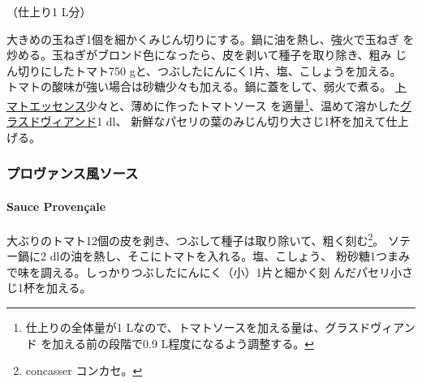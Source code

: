 \begin{recette}

（仕上り1 L分）

大きめの玉ねぎ1個を細かくみじん切りにする。鍋に油を熱し、強火で玉ねぎ
を炒める。玉ねぎがブロンド色になったら、皮を剥いて種子を取り除き、粗み
じん切りにしたトマト750 gと、つぶしたにんにく1片、塩、こしょうを加える。
トマトの酸味が強い場合は砂糖少々も加える。鍋に蓋をして、弱火で煮る。
\protect\hyperlink{essences-diverses}{トマトエッセンス}少々と、薄めに作ったトマトソース
を適量\footnote{仕上りの全体量が1
  Lなので、トマトソースを加える量は、グラスドヴィアンド
  を加える前の段階で0.9 L程度になるよう調整する。}、温めて溶かした\protect\hyperlink{glace-de-viande}{グラスドヴィアンド}1
dl、 新鮮なパセリの葉のみじん切り大さじ1杯を加えて仕上げる。

\maeaki

\hypertarget{ux30d7ux30edux30f4ux30a1ux30f3ux30b9ux98a8ux30bdux30fcux30b9}{%
\subsubsection{プロヴァンス風ソース}\label{ux30d7ux30edux30f4ux30a1ux30f3ux30b9ux98a8ux30bdux30fcux30b9}}

\hypertarget{sauce-provencal}{%
\paragraph{Sauce Provençale}\label{sauce-provencal}}


大ぶりのトマト12個の皮を剥き、つぶして種子は取り除いて、粗く刻む\footnote{concasser
  コンカセ。}。 ソテー鍋に2\undemi{}
dlの油を熱し、そこにトマトを入れる。塩、こしょう、
粉砂糖1つまみで味を調える。しっかりつぶしたにんにく（小）1片と細かく刻
んだパセリ小さじ1杯を加える。


\end{recette}
